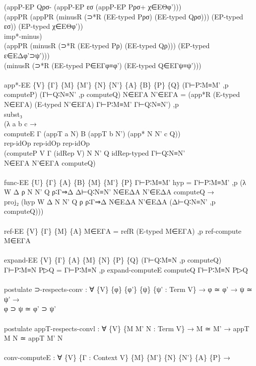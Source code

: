 {\begin{code}
{\>        (appP-EP Qρσ- (appP-EP εσ (appP-EP Pρσ+ χ∈EΘφ'))) \<\\
\>          (appPR (appPR (minusR (⊃*R (EE-typed Pρσ) (EE-typed Qρσ))) (EP-typed εσ)) (EP-typed χ∈EΘφ')) \<\\
\>        imp*-minus)\<\\
\>    (appPR (minusR (⊃*R (EE-typed Pρ) (EE-typed Qρ))) (EP-typed ε∈EΔφ'⊃ψ'))) \<\\
\>  (minusR (⊃*R (EE-typed P∈EΓφ≡φ') (EE-typed Q∈EΓψ≡ψ')))\<\\
\>\<\\
\>app*-EE \{V\} \{Γ\} \{M\} \{M'\} \{N\} \{N'\} \{A\} \{B\} \{P\} \{Q\} (Γ⊢P∶M≡M' ,p computeP) (Γ⊢Q∶N≡N' ,p computeQ) N∈EΓA N'∈EΓA = (app*R (E-typed N∈EΓA) (E-typed N'∈EΓA) Γ⊢P∶M≡M' Γ⊢Q∶N≡N') ,p \<\\
\>  subst₃\<\\
\>    (λ a b c →\<\\
\>       computeE Γ (appT a N) B (appT b N') (app* N N' c Q))\<\\
\>    rep-idOp rep-idOp rep-idOp \<\\
\>    (computeP V Γ (idRep V) N N' Q idRep-typed Γ⊢Q∶N≡N' \<\\
\>      N∈EΓA N'∈EΓA computeQ)\<\\
\>\<\\
\>func-EE \{U\} \{Γ\} \{A\} \{B\} \{M\} \{M'\} \{P\} Γ⊢P∶M≡M' hyp = Γ⊢P∶M≡M' ,p (λ W Δ ρ N N' Q ρ∶Γ⇒Δ Δ⊢Q∶N≡N' N∈EΔA N'∈EΔA computeQ → \<\\
\>  proj₂ (hyp W Δ N N' Q ρ ρ∶Γ⇒Δ N∈EΔA N'∈EΔA (Δ⊢Q∶N≡N' ,p computeQ)))\<\\
\>\<\\
\>ref-EE \{V\} \{Γ\} \{M\} \{A\} M∈EΓA = refR (E-typed M∈EΓA) ,p ref-compute M∈EΓA\<\\
\>\<\\
\>expand-EE \{V\} \{Γ\} \{A\} \{M\} \{N\} \{P\} \{Q\} (Γ⊢Q∶M≡N ,p computeQ) Γ⊢P∶M≡N P▷Q = Γ⊢P∶M≡N ,p expand-computeE computeQ Γ⊢P∶M≡N P▷Q\<\\
\>\<\\
\>postulate ⊃-respects-conv : ∀ \{V\} \{φ\} \{φ'\} \{ψ\} \{ψ' : Term V\} → φ ≃ φ' → ψ ≃ ψ' →\<\\
\>                          φ ⊃ ψ ≃ φ' ⊃ ψ'\<\\
\>\<\\
\>postulate appT-respects-convl : ∀ \{V\} \{M M' N : Term V\} → M ≃ M' → appT M N ≃ appT M' N\<\\
\>\<\\
\>conv-computeE : ∀ \{V\} \{Γ : Context V\} \{M\} \{M'\} \{N\} \{N'\} \{A\} \{P\} →\<\\
}
\end{code}}

